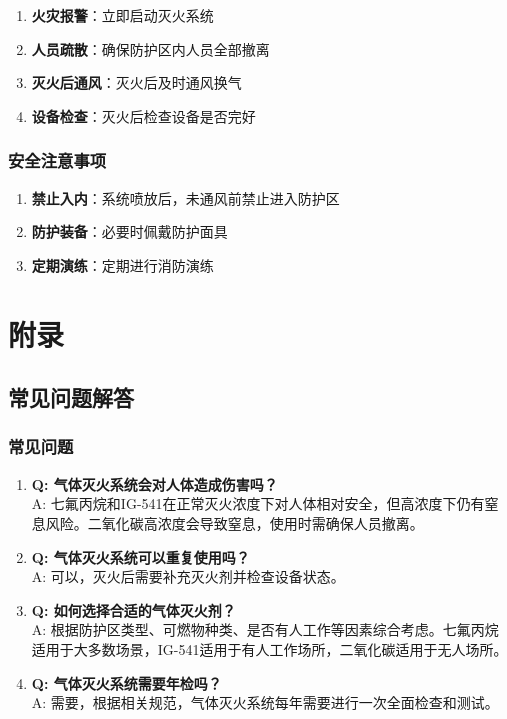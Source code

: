 \documentclass[12pt,UTF8]{ctexbook}
\begin{document}
\begin{enumerate}
    \item \textbf{火灾报警}：立即启动灭火系统
    \item \textbf{人员疏散}：确保防护区内人员全部撤离
    \item \textbf{灭火后通风}：灭火后及时通风换气
    \item \textbf{设备检查}：灭火后检查设备是否完好
\end{enumerate}

\section{安全注意事项}

\begin{enumerate}
    \item \textbf{禁止入内}：系统喷放后，未通风前禁止进入防护区
    \item \textbf{防护装备}：必要时佩戴防护面具
    \item \textbf{定期演练}：定期进行消防演练
\end{enumerate}

\part{附录}

\chapter{常见问题解答}

\section{常见问题}

\begin{enumerate}
    \item \textbf{Q: 气体灭火系统会对人体造成伤害吗？}
    \\A: 七氟丙烷和IG-541在正常灭火浓度下对人体相对安全，但高浓度下仍有窒息风险。二氧化碳高浓度会导致窒息，使用时需确保人员撤离。
    
    \item \textbf{Q: 气体灭火系统可以重复使用吗？}
    \\A: 可以，灭火后需要补充灭火剂并检查设备状态。
    
    \item \textbf{Q: 如何选择合适的气体灭火剂？}
    \\A: 根据防护区类型、可燃物种类、是否有人工作等因素综合考虑。七氟丙烷适用于大多数场景，IG-541适用于有人工作场所，二氧化碳适用于无人场所。
    
    \item \textbf{Q: 气体灭火系统需要年检吗？}
    \\A: 需要，根据相关规范，气体灭火系统每年需要进行一次全面检查和测试。
\end{enumerate}
\end{document}
